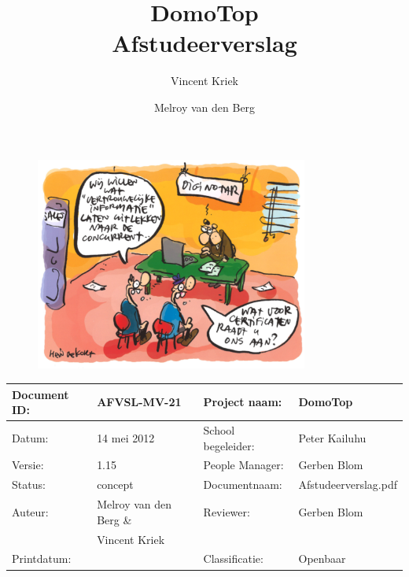 \documentclass[]{article}
\makeatletter
\let\insertdate\@date
\newcommand{\version}{1.15}
\makeatother
\begin{document}
\thispagestyle{plain}

\title{\textbf{DomoTop} \\Afstudeerverslag}
\author{Vincent Kriek \and Melroy van den Berg}

\maketitle

\begin{figure}[htpb]
   \begin{center}
    \includegraphics[width=0.8\textwidth]{voorkant.pdf}
   \end{center}
\end{figure}

\begin{tabular}{|| l | l || l | l ||}\hline
   Document ID: & AFVSL-MV-21          &Project naam:     &DomoTop             \\\hline
   Datum:       &14 mei 2012          &School begeleider:&Peter Kailuhu       \\\hline
   Versie:      &\version              &People Manager:   &Gerben Blom         \\\hline
   Status:      &concept               &Documentnaam:     &Afstudeerverslag.pdf\\\hline
   Auteur:      &Melroy van den Berg \&&Reviewer:         &Gerben Blom         \\
                &Vincent Kriek         &                  &                    \\\hline
   Printdatum:  &\insertdate           &Classificatie:    &Openbaar            \\\hline
\end{tabular}
\end{document}
